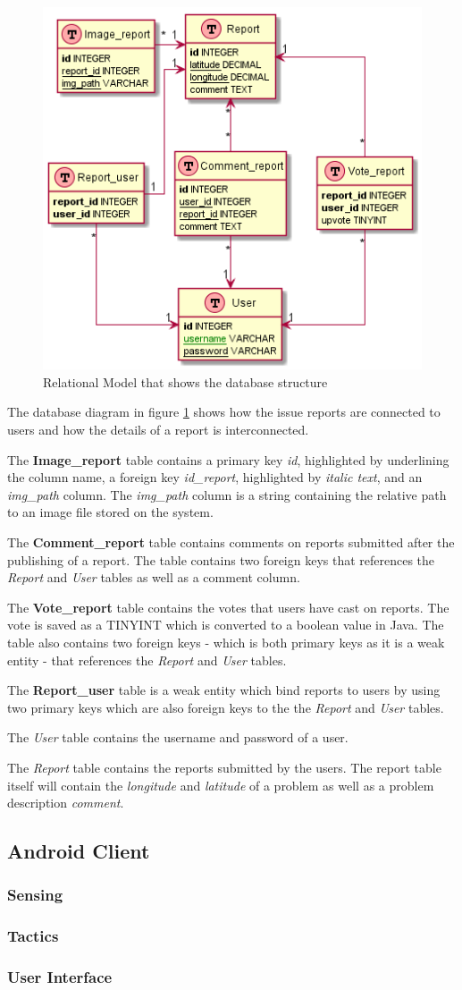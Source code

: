 \begin{figure}[hbt]
\centering
\includegraphics[width=.6\textwidth]{images/relational_model}
\caption{Relational Model that shows the database structure}\label{fig:database_diagram}
\end{figure}

The database diagram in figure \ref{fig:database_diagram} shows how the issue reports are connected to users and how the details of a report is interconnected. 

The \textbf{Image\_report} table contains a primary key \textit{id}, highlighted by underlining the column name, a foreign key \textit{id\_report}, highlighted by \textit{italic text}, and an \textit{img\_path} column. The \textit{img\_path} column is a string containing the relative path to an image file stored on the system. 

The \textbf{Comment\_report} table contains comments on reports submitted after the publishing of a report. The table contains two foreign keys that references the \textit{Report} and \textit{User} tables as well as a comment column.

The \textbf{Vote\_report} table contains the votes that users have cast on reports. The vote is saved as a TINYINT which is converted to a boolean value in Java. The table also contains two foreign keys - which is both primary keys as it is a weak entity - that references the \textit{Report} and \textit{User} tables.

The \textbf{Report\_user} table is a weak entity which bind reports to users by using two primary keys which are also foreign keys to the the \textit{Report} and \textit{User} tables.

The \textit{User} table contains the username and password of a user.

The \textit{Report} table contains the reports submitted by the users. The report table itself will contain the \textit{longitude} and \textit{latitude} of a problem as well as a problem description \textit{comment}.

\subsection{Android Client}
\subsubsection{Sensing}
\subsubsection{Tactics}
\subsubsection{User Interface}